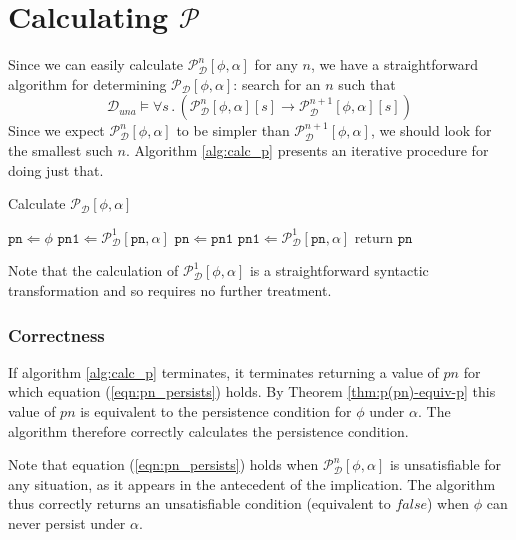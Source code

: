 \section{Calculating $\mathcal{P}$}

Since we can easily calculate $\mathcal{P}_{\mathcal{D}}^{n}[\phi,\alpha]$
for any $n$, we have a straightforward algorithm for determining
$\mathcal{P_{D}}[\phi,\alpha]$: search for an $n$ such that\[
\mathcal{D}_{una}\models\forall s\,.\,\left(\mathcal{P}_{\mathcal{D}}^{n}[\phi,\alpha][s]\rightarrow\mathcal{P}_{\mathcal{D}}^{n+1}[\phi,\alpha][s]\right)\]
Since we expect $\mathcal{P}_{\mathcal{D}}^{n}[\phi,\alpha]$ to be
simpler than $\mathcal{P}_{\mathcal{D}}^{n+1}[\phi,\alpha]$, we should
look for the smallest such $n$. Algorithm \ref{alg:calc_p} presents
an iterative procedure for doing just that.

\begin{algorithm}
\caption{Calculate $\mathcal{P}_\mathcal{D}[\phi,\alpha]$}
\label{alg:calc_p}
\begin{algorithmic}
\STATE $\mathtt{pn} \Leftarrow \phi$
\STATE $\mathtt{pn1} \Leftarrow \mathcal{P}^1_\mathcal{D}[\mathtt{pn},\alpha]$
  \STATE $\mathtt{pn} \Leftarrow \mathtt{pn1}$
  \STATE $\mathtt{pn1} \Leftarrow \mathcal{P}^1_{\mathcal{D}}[\mathtt{pn},\alpha]$
\ENDWHILE
\STATE return $\mathtt{pn}$
\end{algorithmic}
\end{algorithm}

Note that the calculation of $\mathcal{P}_{\mathcal{D}}^{1}[\phi,\alpha]$
is a straightforward syntactic transformation and so requires no further
treatment.


\subsubsection{Correctness}

If algorithm \ref{alg:calc_p} terminates, it terminates returning
a value of $pn$ for which equation (\ref{eqn:pn_persists}) holds.
By Theorem \ref{thm:p(pn)-equiv-p} this value of $pn$ is equivalent
to the persistence condition for $\phi$ under $\alpha$. The algorithm
therefore correctly calculates the persistence condition.

Note that equation (\ref{eqn:pn_persists}) holds when $\mathcal{P}_{\mathcal{D}}^{n}[\phi,\alpha]$
is unsatisfiable for any situation, as it appears in the antecedent
of the implication. The algorithm thus correctly returns an unsatisfiable
condition (equivalent to $false$) when $\phi$ can never persist
under $\alpha$.


